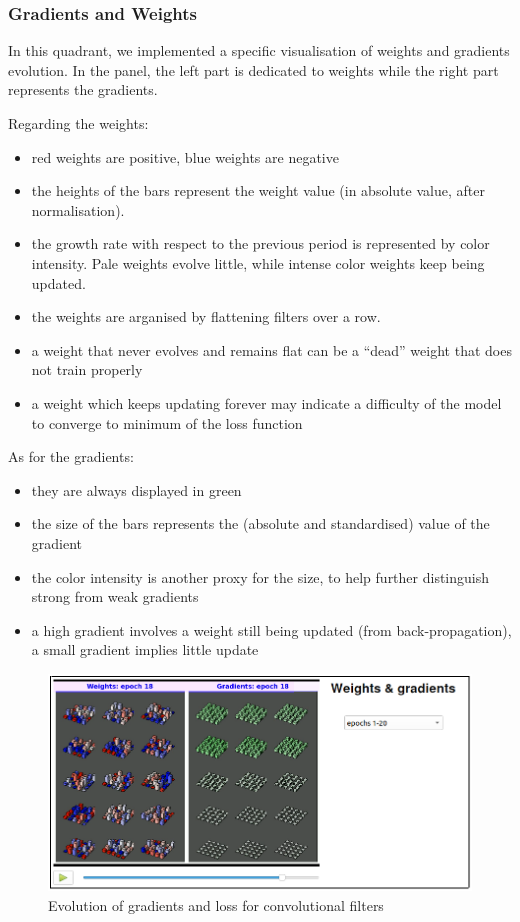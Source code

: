 \subsubsection{Gradients and Weights}

In this quadrant, we implemented a specific visualisation of weights and gradients evolution. In the panel, the left part is dedicated to weights while the right part represents the gradients. 

Regarding the weights:

\begin{itemize}
	\item red weights are positive, blue weights are negative
	\item the heights of the bars represent the weight value (in absolute value, after normalisation).
	\item the growth rate with respect to the previous period is represented by  color intensity. Pale weights evolve little, while intense color weights keep being updated.
	\item the weights are arganised by flattening filters over a row.
	\item a weight that never evolves and remains flat can be a ``dead'' weight that does not train properly
	\item a weight which keeps updating forever may indicate a difficulty of the model to converge to minimum of the loss function
\end{itemize} 

As for the gradients:

\begin{itemize}
	\item they are always displayed in green
	\item the size of the bars represents the (absolute and standardised) value of the gradient
	\item the color intensity is another proxy for the size, to help further distinguish strong from weak gradients
	\item a high gradient involves a weight still being updated (from back-propagation), a small gradient implies little update
\end{itemize}

\begin{figure}[H]
    \centering
    \includegraphics[scale=0.6]{images/weights-grads-viewer/Quadrant_weight.png}
    \caption{Evolution of gradients and loss for convolutional filters}
\end{figure}

